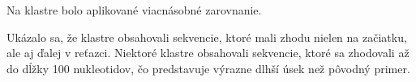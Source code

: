 Na klastre bolo aplikované viacnásobné zarovnanie.

Ukázalo sa, že klastre obsahovali sekvencie, ktoré mali zhodu nielen na začiatku, ale aj ďalej v reťazci.
Niektoré klastre obsahovali sekvencie, ktoré sa zhodovali až do dĺžky 100 nukleotidov, čo predstavuje výrazne dlhší úsek než pôvodný primer.
